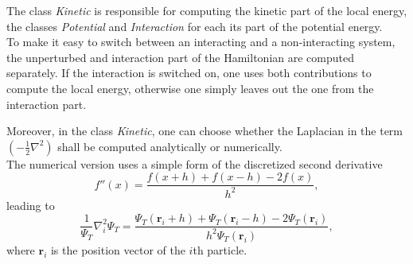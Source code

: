 The class \textit{Kinetic} is responsible for computing the kinetic part of the local energy, the classes \textit{Potential} and \textit{Interaction} for each its part of the potential energy. \\
To make it easy to switch between an interacting and a non-interacting system, the unperturbed and interaction part of the Hamiltonian are computed separately. If the interaction is switched on, one uses both contributions to compute the local energy, otherwise one simply leaves out the one from the interaction part. 

Moreover, in the class \textit{Kinetic}, one can choose whether the Laplacian in the term $\left(-\frac{1}{2}\nabla^2 \right)$ shall be computed analytically or numerically.\\
The numerical version uses a simple form of the discretized second derivative
\[
f''(x) = \frac{f(x+h)+f(x-h)-2 f(x)}{h^ 2},
\]
leading to
\[
\frac{1}{ \Psi_T}\nabla_i^2\Psi_T = \frac{\Psi_T\left(\mathbf{r}_i+h\right)+\Psi_T\left(\mathbf{r}_i-h\right)-2\Psi_T\left(\mathbf{r}_i\right)}{h^2 \Psi_T\left(\mathbf{r}_i\right)},
\]
where $\mathbf{r}_i$ is the position vector of the $i$th particle.

